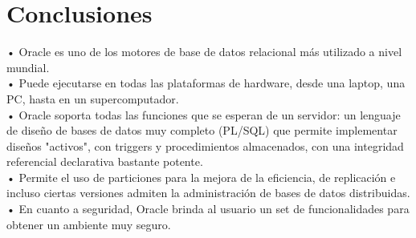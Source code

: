 \section{Conclusiones}
\vspace{12pt}

• Oracle es uno de los motores de base de datos relacional más utilizado a nivel mundial.\\
• Puede ejecutarse en todas las plataformas de hardware, desde una laptop, una PC, hasta en un supercomputador.\\
• Oracle soporta todas las funciones que se esperan de un servidor: un lenguaje de diseño de bases de datos muy completo (PL/SQL) que permite implementar diseños "activos", con triggers y procedimientos almacenados, con una integridad referencial declarativa bastante potente.\\
• Permite el uso de particiones para la mejora de la eficiencia, de replicación e incluso ciertas versiones admiten la administración de bases de datos distribuidas.\\
• En cuanto a seguridad, Oracle brinda al usuario un set de funcionalidades para obtener un ambiente muy seguro.\\